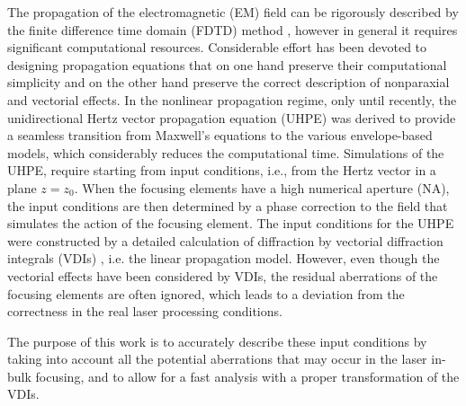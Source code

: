 \documentclass[9pt,twocolumn,twoside]{osajnl}
\begin{document}
The propagation of the electromagnetic (EM) field can be rigorously described by the finite difference time domain (FDTD) method \cite{liu2000three}, however in general it requires significant computational resources. Considerable effort has been devoted to designing propagation equations that on one hand preserve their computational simplicity and on the other hand preserve the correct description of nonparaxial and vectorial effects. In the nonlinear propagation regime, only until recently, the unidirectional Hertz vector propagation equation (UHPE) \cite{couairon2015propagation, PhysRevE.100.033316} was derived to provide a seamless transition from Maxwell’s equations to the various envelope-based models, which considerably reduces the computational time. Simulations of the UHPE, require starting from input conditions, i.e., from the Hertz vector in a plane $z = z_0$. When the focusing elements have a high numerical aperture (NA), the input conditions are then determined by a phase correction to the field that simulates the action of the focusing element. The input conditions for the UHPE were constructed by a detailed calculation of diffraction by vectorial diffraction integrals (VDIs) \cite{varga2000focusing1,varga2000focusing2}, i.e. the linear propagation model. However, even though the vectorial effects have been considered by VDIs, the residual aberrations of the focusing elements are often ignored, which leads to a deviation from the correctness in the real laser processing conditions.

The purpose of this work is to accurately describe these input conditions by taking into account all the potential aberrations that may occur in the laser in-bulk focusing, and to allow for a fast analysis with a proper transformation of the VDIs. 
\end{document}
